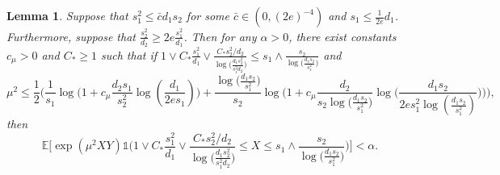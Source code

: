\documentclass{article}
\newcommand{\EE}{\mathbb{E}}
\newcommand{\one}{\mathds{1}}
\newcommand{\Ct}{C_{*}}
\newtheorem{lemma}{Lemma}
\theoremstyle{remark}
\begin{document}
\begin{lemma}\label{lem_lb_s2d2big_truncchi2}
    Suppose that $s_1^2 \leq \bar{c}d_1s_2$ for some $\bar{c} \in (0,(2e)^{-4})$ and $s_1 \leq \frac{1}{2e}d_1$. Furthermore, suppose that $\frac{s^2_2}{d_2} \geq 2e\frac{s_1^2}{d_1}$. Then for any $\alpha > 0$, there exist constants $c_\mu > 0$ and $C_* \geq 1$ such that if $1 \vee \Ct \frac{s_1^2}{d_1} \vee  \frac{\Ct s_2^2/d_2}{\log\big(\frac{d_1s_2^2}{s_1^2d_2}\big)} \leq s_1\wedge\frac{s_2}{\log\big(\frac{d_1s_2}{s_1^2}\big)}$ and
    $$\mu^2 \leq \frac12\bigg(\frac{1}{s_1}\log\Big(1 + c_\mu \frac{d_2s_1}{s_2^2}\log(\frac{d_1}{2es_1})\Big) + \frac{\log\big(\frac{d_1s_2}{s_1^2}\big)}{s_2}\log\Big(1 + c_\mu \frac{d_2}{s_2\log\big(\frac{d_1s_2}{s_1^2}\big)}\log\big(\frac{d_1s_2}{2es_1^2\log(\frac{d_1s_2}{s_1^2})}\big)\Big)\bigg),$$
    then 
    \[\EE\bigg[\exp(\mu^2XY)\one\bigg( 1 \vee \Ct \frac{s_1^2}{d_1} \vee  \frac{\Ct s_2^2/d_2}{\log\big(\frac{d_1s_2^2}{s_1^2d_2}\big)} \leq X \leq s_1\wedge \frac{s_2}{\log\big(\frac{d_1s_2}{s_1^2}\big)}\bigg)\bigg] < \alpha.\]
\end{lemma}
\end{document}
